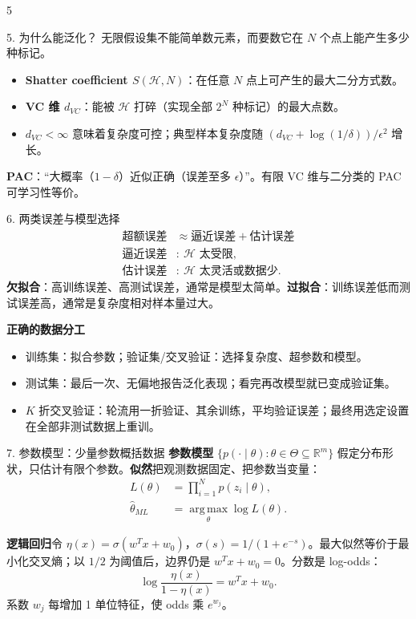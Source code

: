 \documentclass[a4paper,landscape,fontset=fandol]{ctexart}
\newcommand{\term}[1]{\textbf{\color{teal!80!black}#1}}
\newcommand{\R}{\mathbb{R}}
\newcommand{\argmax}{\operatorname*{arg\,max}}
\begin{document}
\begin{multicols*}{5}
\begin{boxx}{5. 为什么能泛化？}
无限假设集不能简单数元素，而要数它在 $N$ 个点上能产生多少种标记。
\begin{itemize}
  \item \term{Shatter coefficient $S(\mathcal H,N)$}：在任意 $N$ 点上可产生的最大二分方式数。
  \item \term{VC 维 $d_{VC}$}：能被 $\mathcal H$ 打碎（实现全部 $2^N$ 种标记）的最大点数。
  \item $d_{VC}<\infty$ 意味着复杂度可控；典型样本复杂度随 $(d_{VC}+\log(1/\delta))/\epsilon^2$ 增长。
\end{itemize}
\term{PAC}：“大概率（$1-\delta$）近似正确（误差至多 $\epsilon$）”。有限 VC 维与二分类的 PAC 可学习性等价。
\end{boxx}

\begin{boxx}{6. 两类误差与模型选择}
\[
\begin{aligned}
\text{超额误差}&\approx \text{逼近误差}+\text{估计误差}\\
\text{逼近误差}&:\ \mathcal H\text{ 太受限},\\
\text{估计误差}&:\ \mathcal H\text{ 太灵活或数据少}.
\end{aligned}
\]
\term{欠拟合}：高训练误差、高测试误差，通常是模型太简单。\term{过拟合}：训练误差低而测试误差高，通常是复杂度相对样本量过大。

\term{正确的数据分工}
\begin{itemize}
  \item 训练集：拟合参数；验证集/交叉验证：选择复杂度、超参数和模型。
  \item 测试集：最后一次、无偏地报告泛化表现；看完再改模型就已变成验证集。
  \item $K$ 折交叉验证：轮流用一折验证、其余训练，平均验证误差；最终用选定设置在全部非测试数据上重训。
\end{itemize}
\end{boxx}

\columnbreak

\begin{boxx}{7. 参数模型：少量参数概括数据}
\term{参数模型} $\{p(\cdot\mid\theta):\theta\in\Theta\subseteq\R^m\}$ 假定分布形状，只估计有限个参数。\term{似然}把观测数据固定、把参数当变量：
\[
\begin{aligned}
L(\theta)&=\prod_{i=1}^N p(z_i\mid\theta),\\
\hat\theta_{ML}&=\argmax_\theta \log L(\theta).
\end{aligned}
\]

\term{逻辑回归}令 $\eta(x)=\sigma(w^Tx+w_0)$，$\sigma(s)=1/(1+e^{-s})$。最大似然等价于最小化交叉熵；以 $1/2$ 为阈值后，边界仍是 $w^Tx+w_0=0$。分数是 log-odds：
\[
\log\frac{\eta(x)}{1-\eta(x)}=w^Tx+w_0.
\]
系数 $w_j$ 每增加 1 单位特征，使 odds 乘 $e^{w_j}$。


\end{boxx}
\end{multicols*}
\end{document}
